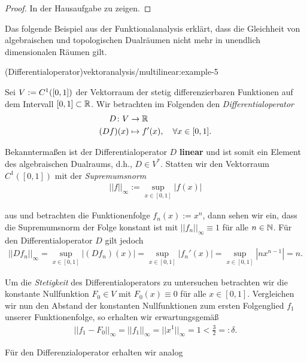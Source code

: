 \begin{proof}
 In der Hausaufgabe zu zeigen.
\end{proof}

\par
Das folgende Beispiel aus der Funktionalanalysis erklärt, dass die Gleichheit von algebraischen und topologischen Dualräumen nicht mehr in unendlich dimensionalen Räumen gilt.
\begin{example}{(Differentialoperator)}{vektoranalysis/multilinear:example-5}



\par
Sei \(V := C^1([0,1])\) der Vektorraum der stetig differenzierbaren Funktionen auf dem Intervall \([0,1] \subset \mathbb{R}\).
Wir betrachten im Folgenden den \emph{Differentialoperator}
\begin{align*}
D \colon V &\rightarrow \mathbb{R} \\
(Df)(x) &\mapsto f'(x), \quad \forall x \in [0,1].
\end{align*}
\par
Bekanntermaßen ist der Differentialoperator \(D\) \textbf{linear} und ist somit ein Element des algebraischen Dualraums, d.h., \(D \in V^\ast\).
Statten wir den Vektorraum \(C^1([0,1])\) mit der \emph{Supremumsnorm}
\begin{align*}
||f||_\infty := \sup_{x \in [0,1]} |f(x)|
\end{align*}
\par
aus und betrachten die Funktionenfolge \(f_n(x) := x^n\), dann sehen wir ein, dass die Supremumsnorm der Folge konstant ist mit \(||f_n||_\infty \equiv 1\) für alle \(n\in\mathbb{N}\).
Für den Differentialoperator \(D\) gilt jedoch
\begin{align*}
||Df_n||_\infty = \sup_{x \in [0,1]} |(Df_n)(x)| = \sup_{x \in [0,1]} |f_n'(x)| = \sup_{x \in [0,1]} |nx^{n-1}| = n.
\end{align*}
\par
Um die \emph{Stetigkeit} des Differentialoperators zu untersuchen betrachten wir die konstante Nullfunktion \(F_0 \in V\) mit \(F_0(x) \equiv 0\) für alle \(x \in [0,1]\).
Vergleichen wir nun den Abstand der konstanten Nullfunktionen zum ersten Folgenglied \(f_1\) unserer Funktionenfolge, so erhalten wir erwartungsgemäß
\begin{align*}
||f_1 - F_0||_\infty = ||f_1||_\infty = ||x^1||_\infty = 1 < \frac{3}{2} =: \delta.
\end{align*}
\par
Für den Differenzialoperator erhalten wir analog

\end{example}
